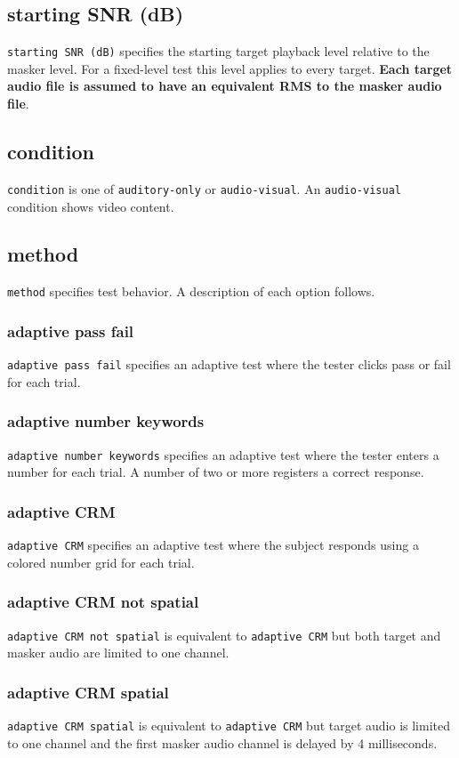 \documentclass[11pt,pdftex,letterpaper]{article}
\begin{document}
\subsection{starting SNR (dB)}
\texttt{starting SNR (dB)} specifies the starting target playback level relative to the masker level. For a fixed-level test this level applies to every target. \textbf{Each target audio file is assumed to have an equivalent RMS to the masker audio file}.
\subsection{condition}
\texttt{condition} is one of \texttt{auditory-only} or \texttt{audio-visual}. An \texttt{audio-visual} condition shows video content.
\subsection{method}
\texttt{method} specifies test behavior. A description of each option follows.
\subsubsection{adaptive pass fail}
\texttt{adaptive pass fail} specifies an adaptive test where the tester clicks pass or fail for each trial.
\subsubsection{adaptive number keywords}
\texttt{adaptive number keywords} specifies an adaptive test where the tester enters a number for each trial. A number of two or more registers a correct response.
\subsubsection{adaptive CRM}
\texttt{adaptive CRM} specifies an adaptive test where the subject responds using a colored number grid for each trial.
\subsubsection{adaptive CRM not spatial}
\texttt{adaptive CRM not spatial} is equivalent to \texttt{adaptive CRM} but both target and masker audio are limited to one channel.
\subsubsection{adaptive CRM spatial}
\texttt{adaptive CRM spatial} is equivalent to \texttt{adaptive CRM} but target audio is limited to one channel and the first masker audio channel is delayed by 4 milliseconds.
\end{document}

